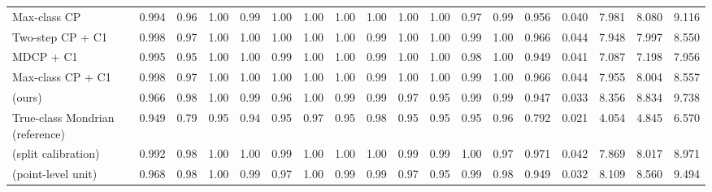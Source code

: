 \begin{table}[!htbp]
{\begin{tabular}{lccccccccccccccccc}
Max-class CP & 0.994 & 0.96 & 1.00 & 0.99 & 1.00 & 1.00 & 1.00 & 1.00 & 1.00 & 1.00 & 0.97 & 0.99 & 0.956 & 0.040 & 7.981 & 8.080 & 9.116 \\
Two-step CP + C1 & 0.998 & 0.97 & 1.00 & 1.00 & 1.00 & 1.00 & 1.00 & 0.99 & 1.00 & 1.00 & 0.99 & 1.00 & 0.966 & 0.044 & 7.948 & 7.997 & 8.550 \\
MDCP + C1 & 0.995 & 0.95 & 1.00 & 1.00 & 0.99 & 1.00 & 1.00 & 0.99 & 1.00 & 1.00 & 0.98 & 1.00 & 0.949 & 0.041 & 7.087 & 7.198 & 7.956 \\
Max-class CP + C1 & 0.998 & 0.97 & 1.00 & 1.00 & 1.00 & 1.00 & 1.00 & 0.99 & 1.00 & 1.00 & 0.99 & 1.00 & 0.966 & 0.044 & 7.955 & 8.004 & 8.557 \\
\gamut{} (ours) & 0.966 & 0.98 & 1.00 & 0.99 & 0.96 & 1.00 & 0.99 & 0.99 & 0.97 & 0.95 & 0.99 & 0.99 & 0.947 & 0.033 & 8.356 & 8.834 & 9.738 \\
True-class Mondrian (reference) & 0.949 & 0.79 & 0.95 & 0.94 & 0.95 & 0.97 & 0.95 & 0.98 & 0.95 & 0.95 & 0.95 & 0.96 & 0.792 & 0.021 & 4.054 & 4.845 & 6.570 \\
\gamut{} (split calibration) & 0.992 & 0.98 & 1.00 & 1.00 & 0.99 & 1.00 & 1.00 & 1.00 & 0.99 & 0.99 & 1.00 & 0.97 & 0.971 & 0.042 & 7.869 & 8.017 & 8.971 \\
\gamut{} (point-level unit) & 0.968 & 0.98 & 1.00 & 0.99 & 0.97 & 1.00 & 0.99 & 0.99 & 0.97 & 0.95 & 0.99 & 0.98 & 0.949 & 0.032 & 8.109 & 8.560 & 9.494 \\
\bottomrule
\end{tabular}}
\end{table}

